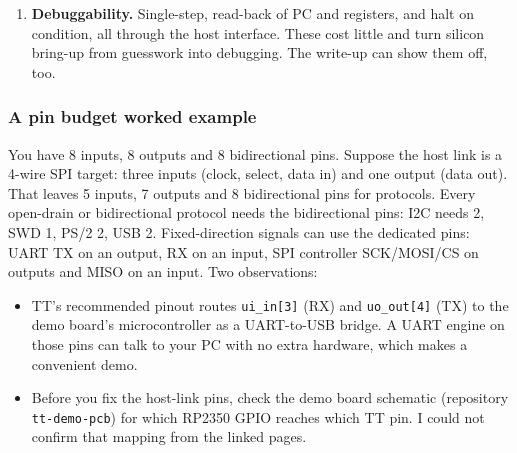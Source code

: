 \begin{enumerate}[label=\textbf{D\arabic*.}]
    programs, configure engines, and stream data in and out at run time?
    This costs pins, and it is a protocol you must make robust, because if
    the loader is broken nothing else matters. Options: a simple SPI target
    on dedicated \texttt{ui\_in}/\texttt{uo\_out} pins (sampled, so a few
    MHz at most, \cref{sec:meta}(b)), or a parallel byte port with a strobe
    for more bandwidth. After deselection the chip loses state
    (\cref{sec:reset}), so the host must be able to reload everything.
  \item \textbf{Debuggability.} Single-step, read-back of PC and registers,
    and halt on condition, all through the host interface. These cost
    little and turn silicon bring-up from guesswork into debugging. The
    write-up can show them off, too.
\end{enumerate}

\subsubsection{A pin budget worked example}
You have 8 inputs, 8 outputs and 8 bidirectional pins. Suppose the host link
is a 4-wire SPI target: three inputs (clock, select, data in) and one output
(data out). That leaves 5 inputs, 7 outputs and 8 bidirectional pins for
protocols. Every open-drain or bidirectional protocol needs the
bidirectional pins: I2C needs 2, SWD 1, PS/2 2, USB 2. Fixed-direction
signals can use the dedicated pins: UART TX on an output, RX on an input,
SPI controller SCK/MOSI/CS on outputs and MISO on an input. Two observations:
\begin{itemize}
  \item TT's recommended pinout routes \texttt{ui\_in[3]} (RX) and
    \texttt{uo\_out[4]} (TX) to the demo board's microcontroller as a
    UART-to-USB bridge. A UART engine on those pins can talk to your PC
    with no extra hardware, which makes a convenient demo.
  \item Before you fix the host-link pins, check the demo board schematic
    (repository \texttt{tt-demo-pcb}) for which RP2350 GPIO reaches which
    TT pin. I could not confirm that mapping from the linked pages.
\end{itemize}

